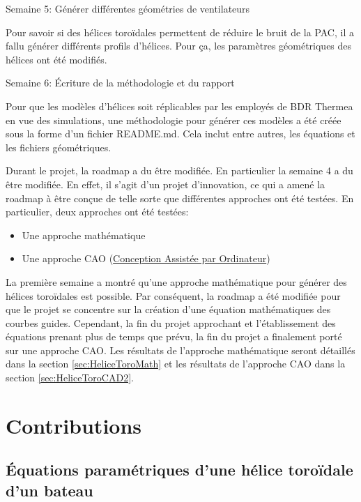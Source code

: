 \documentclass{article}
\begin{document}
Semaine 5: Générer différentes géométries de ventilateurs

Pour savoir si des hélices toroïdales permettent de réduire le bruit de la PAC, il a fallu générer différents profils d'hélices. Pour ça, les paramètres géométriques des hélices ont été modifiés.

Semaine 6: Écriture de la méthodologie et du rapport

Pour que les modèles d'hélices soit réplicables par les employés de BDR Thermea en vue des simulations, une méthodologie pour générer ces modèles a été créée sous la forme d'un fichier README.md. Cela inclut entre autres, les équations et les fichiers géométriques.

\vspace{1cm}

Durant le projet, la roadmap a du être modifiée. En particulier la semaine 4 a du être modifiée. En effet, il s'agit d'un projet d'innovation, ce qui a amené la roadmap à être conçue de telle sorte que différentes approches ont été testées. En particulier, deux approches ont été testées:

\begin{itemize}
    \item Une approche mathématique
    \item Une approche CAO (\href{https://fr.wikipedia.org/wiki/Conception_assist%C3%A9e_par_ordinateur}{Conception Assistée par Ordinateur})
\end{itemize}

La première semaine a montré qu'une approche mathématique pour générer des hélices toroïdales est possible. Par conséquent, la roadmap a été modifiée pour que le projet se concentre sur la création d'une équation mathématiques des courbes guides. Cependant, la fin du projet approchant et l'établissement des équations prenant plus de temps que prévu, la fin du projet a finalement porté sur une approche CAO. Les résultats de l'approche mathématique seront détaillés dans la section \ref{sec:HeliceToroMath} et les résultats de l'approche CAO dans la section \ref{sec:HeliceToroCAD2}.

\section{Contributions}

\subsection{Équations paramétriques d'une hélice toroïdale d'un bateau}
\end{document}
